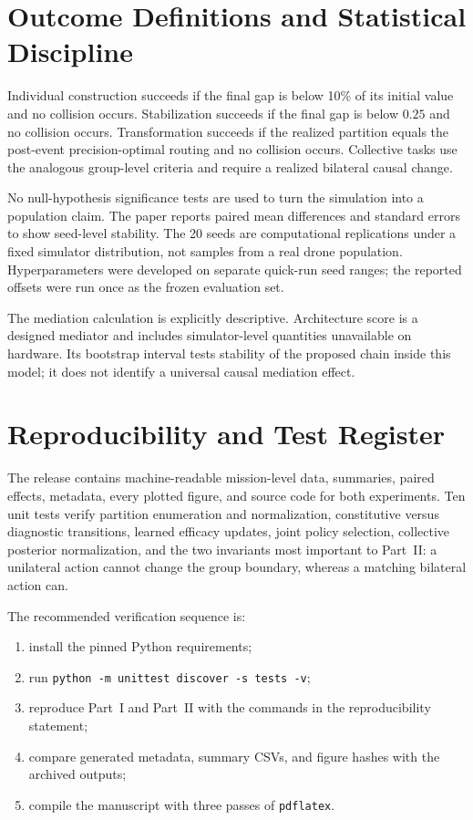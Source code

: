 \documentclass[11pt,a4paper]{article}
\numberwithin{equation}{section}
\begin{document}
\section{Outcome Definitions and Statistical Discipline}

Individual construction succeeds if the final gap is below 10\% of its
initial value and no collision occurs. Stabilization succeeds if the final
gap is below $0.25$ and no collision occurs. Transformation succeeds if the
realized partition equals the post-event precision-optimal routing and no
collision occurs. Collective tasks use the analogous group-level criteria
and require a realized bilateral causal change.

No null-hypothesis significance tests are used to turn the simulation into a
population claim. The paper reports paired mean differences and standard
errors to show seed-level stability. The 20 seeds are computational
replications under a fixed simulator distribution, not samples from a real
drone population. Hyperparameters were developed on separate quick-run seed
ranges; the reported offsets were run once as the frozen evaluation set.

The mediation calculation is explicitly descriptive. Architecture score is
a designed mediator and includes simulator-level quantities unavailable on
hardware. Its bootstrap interval tests stability of the proposed chain inside
this model; it does not identify a universal causal mediation effect.

\section{Reproducibility and Test Register}

The release contains machine-readable mission-level data, summaries, paired
effects, metadata, every plotted figure, and source code for both experiments.
Ten unit tests verify partition enumeration and normalization, constitutive
versus diagnostic transitions, learned efficacy updates, joint policy
selection, collective posterior normalization, and the two invariants most
important to Part~II: a unilateral action cannot change the group boundary,
whereas a matching bilateral action can.

The recommended verification sequence is:
\begin{enumerate}[leftmargin=1.8em]
 \item install the pinned Python requirements;
 \item run \texttt{python -m unittest discover -s tests -v};
 \item reproduce Part~I and Part~II with the commands in the reproducibility
 statement;
 \item compare generated metadata, summary CSVs, and figure hashes with the
 archived outputs;
 \item compile the manuscript with three passes of \texttt{pdflatex}.
\end{enumerate}
\end{document}
